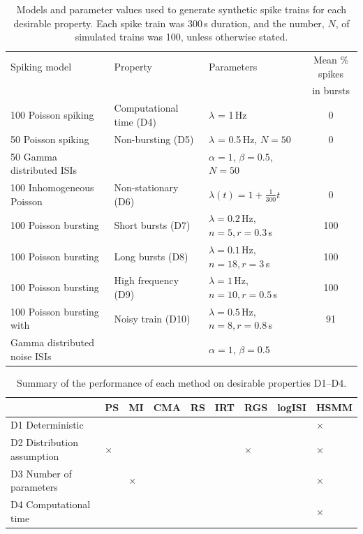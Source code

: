 \documentclass[12pt, titlepage]{article}
\begin{document}
			\begin{table}[h] \centering \small{
					\begin{tabular}{|l|l|l|c|}
						\hline
						Spiking model & Property & Parameters & Mean \% spikes 
						\\ & & & in bursts
						\\ \hline   100 Poisson spiking &  Computational time (D4) & $\lambda$ = 1$\,$Hz & 0 
						\\ \hline  50 Poisson spiking &  Non-bursting (D5) &  $\lambda$ = 0.5$\,$Hz, $N=50$ & 0 
						\\  50 Gamma distributed ISIs & & $\alpha=1$, $\beta = 0.5$, $N=50$ & 
						\\ \hline  100 Inhomogeneous Poisson &  Non-stationary (D6) & $\lambda(t) = 1+\frac{1}{300}t$ & 0 
						\\ \hline  100 Poisson bursting &  Short bursts (D7) & $\lambda = 0.2\,$Hz, $n=5, r=0.3\,$s &  100
						\\  \hline   100 Poisson bursting & Long bursts (D8) &  $\lambda = 0.1\,$Hz, $n=18, r=3\,$s & 100 
						\\  \hline   100 Poisson bursting &  High frequency (D9) & $\lambda = 1\,$Hz, $n=10, r=0.5\,$s & 100
						\\  \hline  100 Poisson bursting with &  Noisy train (D10) & $\lambda = 0.5\,$Hz, $n=8, r=0.8\,$s & 91 
						\\   Gamma distributed noise ISIs& & $\alpha=1$, $\beta = 0.5$  & 
						\\ \hline
					\end{tabular}}
					\caption{Models and parameter values used to generate synthetic spike trains for each desirable property. Each spike train was 300$\,$s duration, and the number, $N$, of simulated trains was 100, unless otherwise stated.} \label{sim_params}
				\end{table}
				\clearpage
				\begin{table} \centering  \begin{tabular}{|l|llllllll|}
						\hline
						& PS & MI & CMA & RS & IRT & RGS & logISI & HSMM
						\\ \hline
						 D1 Deterministic & \checkmark & \checkmark & \checkmark & \checkmark & \checkmark & \checkmark & \checkmark & $\times$
						\\ D2  Distribution assumption&  $\times$ & \checkmark & \checkmark & \checkmark & \checkmark & $\times$ & \checkmark & $\times$
						\\  D3  Number of parameters&  \checkmark & $\times$ & \checkmark & \checkmark & \checkmark & \checkmark & \checkmark & $\times$
						\\D4  Computational time & \checkmark & \checkmark & \checkmark & \checkmark & \checkmark & \checkmark & \checkmark & $\times$
						\\ \hline
					\end{tabular}
					\caption{Summary of the performance of each method on desirable properties D1--D4.} \label{des_results1}
				\end{table}
\end{document}
